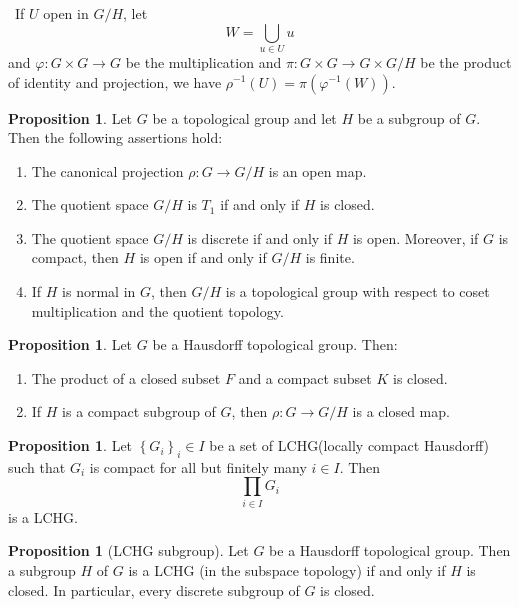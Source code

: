 \documentclass[12pt,a4paper]{book}
\newenvironment{prooff}{{\noindent\it\textcolor{cyan!40!black}{Proof}:}\,}{\par}
\newenvironment{enu}{\begin{enumerate}[(1)]}{\end{enumerate}}
\theoremstyle{definition}
\newtheorem{prop}[defn]{Proposition}
\begin{document}
\begin{prooff}
    If $U$ open in $G/H$, let $$W=\bigcup_{u\in U}u$$ and $\varphi:G\times G\rightarrow G$ be the multiplication
    and $\pi:G\times G\rightarrow G\times G/H$ be the product of identity and projection,
    we have $\rho^{-1}(U)=\pi(\varphi^{-1}(W))$.
\end{prooff}
\begin{prop}
    Let $G$ be a topological group and let $H$ be a subgroup of $G$. Then the following assertions hold:
    \begin{enu}
        \item The canonical projection $\rho: G \rightarrow G / H$ is an open map.
        \item The quotient space $G / H$ is $T_1$ if and only if $H$ is closed.
        \item The quotient space $G / H$ is discrete if and only if $H$ is open. Moreover, if $G$ is compact, then $H$ is open if and only if $G / H$ is finite.
        \item If $H$ is normal in $G$, then $G / H$ is a topological group with respect to coset multiplication and the quotient topology.
    \end{enu}
    \label{proposition: topological group, quotient}
\end{prop}
\begin{prop}
    Let $G$ be a Hausdorff topological group. Then:
    \begin{enu}
        \item The product of a closed subset $F$ and a compact subset $K$ is closed.
        \item If $H$ is a compact subgroup of $G$, then $\rho: G \rightarrow G / H$ is a closed map.
    \end{enu}
\end{prop}
\begin{prop}
    Let $\left\{G_i\right\}_i \in I$ be a set of LCHG(locally compact Hausdorff) such that $G_i$ is compact for all but finitely many $i \in I$. Then
    $$
        \prod_{i \in I} G_i
    $$
    is a LCHG.
\end{prop}
\begin{prop}[LCHG subgroup]
    Let $G$ be a Hausdorff topological group. Then a subgroup $H$ of $G$ is a LCHG (in the subspace topology) if and only if $H$ is closed.
    In particular, every discrete subgroup of $G$ is closed.
    \label{proposition: LCHG subgroup}
\end{prop}
\end{document}
